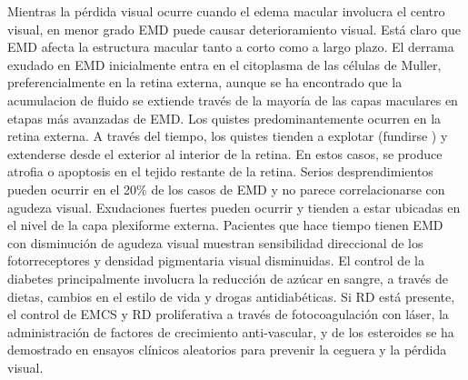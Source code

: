 \begin{description}
Mientras la pérdida visual ocurre cuando el edema macular involucra el centro visual, en menor grado EMD puede causar deterioramiento visual. Está claro que EMD afecta la estructura macular tanto a corto como a largo plazo. El derrama exudado en EMD inicialmente entra en el citoplasma de las células de Muller, preferencialmente en la retina externa, aunque se ha encontrado que la acumulacion de fluido se extiende través de la mayoría de las capas maculares en etapas más avanzadas de EMD. Los quistes predominantemente ocurren en la retina externa. A través del tiempo, los quistes tienden a explotar (fundirse ) y extenderse desde el exterior al interior de la retina. En estos casos, se produce atrofia o apoptosis en el tejido restante de la retina. Serios desprendimientos pueden ocurrir en el 20\% de los casos de EMD y no parece correlacionarse con agudeza visual. Exudaciones fuertes pueden ocurrir y tienden a estar ubicadas en el nivel de la capa plexiforme externa. Pacientes que hace tiempo tienen EMD con disminución de agudeza visual muestran sensibilidad direccional de los fotorreceptores y densidad pigmentaria visual disminuidas.
El control de la diabetes principalmente involucra la reducción de azúcar en sangre, a través de dietas, cambios en el estilo de vida y drogas antidiabéticas. Si RD está presente,  el control de EMCS y RD proliferativa a través de fotocoagulación con láser, la administración de factores de crecimiento anti-vascular, y de los esteroides se ha demostrado en ensayos clínicos aleatorios para prevenir la ceguera y la pérdida visual.

\end{description}
